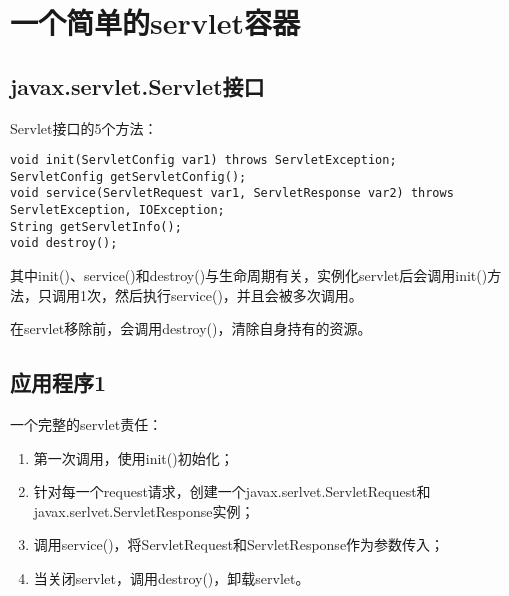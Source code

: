 \chapter{一个简单的servlet容器}
\section{javax.servlet.Servlet接口}
Servlet接口的5个方法：
\begin{lstlisting}
void init(ServletConfig var1) throws ServletException;
ServletConfig getServletConfig();
void service(ServletRequest var1, ServletResponse var2) throws ServletException, IOException;
String getServletInfo();
void destroy();
\end{lstlisting}
其中init()、service()和destroy()与生命周期有关，实例化servlet后会调用init()方法，只调用1次，然后执行service()，并且会被多次调用。
\par 在servlet移除前，会调用destroy()，清除自身持有的资源。
\section{应用程序1}
一个完整的servlet责任：
\begin{enumerate}
	\item 第一次调用，使用init()初始化；
	\item 针对每一个request请求，创建一个javax.serlvet.ServletRequest和javax.serlvet.ServletResponse实例；
	\item 调用service()，将ServletRequest和ServletResponse作为参数传入；
	\item 当关闭servlet，调用destroy()，卸载servlet。
\end{enumerate}
